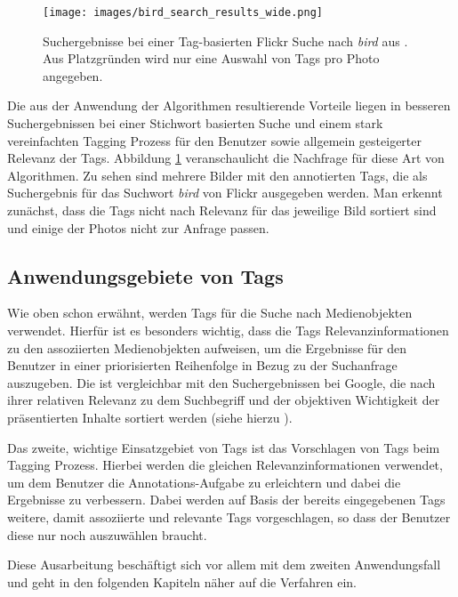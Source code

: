 \begin{figure}[htbp]
  \centering
    \texttt{[image: images/bird\_search\_results\_wide.png]}
  \caption{Suchergebnisse bei einer Tag-basierten Flickr Suche nach \emph{bird} aus \cite{ranking}. Aus Platzgründen wird nur eine Auswahl von Tags pro Photo angegeben.}
  \label{fig:images_bird_search_results}
\end{figure}

Die aus der Anwendung der Algorithmen resultierende Vorteile liegen in besseren Suchergebnissen bei einer Stichwort basierten Suche und einem stark vereinfachten Tagging Prozess für den Benutzer sowie allgemein gesteigerter Relevanz der Tags. Abbildung \ref{fig:images_bird_search_results} veranschaulicht die Nachfrage für diese Art von Algorithmen. Zu sehen sind mehrere Bilder mit den annotierten Tags, die als Suchergebnis für das Suchwort \emph{bird} von Flickr ausgegeben werden. Man erkennt zunächst, dass die Tags nicht nach Relevanz für das jeweilige Bild sortiert sind und einige der Photos nicht zur Anfrage passen.



\subsection{Anwendungsgebiete von Tags} %
\label{sub:anwendungsgebiete}

Wie oben schon erwähnt, werden Tags für die Suche nach Medienobjekten verwendet. Hierfür ist es besonders wichtig, dass die Tags Relevanzinformationen zu den assoziierten Medienobjekten aufweisen, um die Ergebnisse für den Benutzer in einer priorisierten Reihenfolge in Bezug zu der Suchanfrage auszugeben. Die ist vergleichbar mit den Suchergebnissen bei Google, die nach ihrer relativen Relevanz zu dem Suchbegriff und der objektiven Wichtigkeit der präsentierten Inhalte sortiert werden (siehe hierzu \cite{googlePageRank}).

Das zweite, wichtige Einsatzgebiet von Tags ist das Vorschlagen von Tags beim Tagging Prozess. Hierbei werden die gleichen Relevanzinformationen verwendet, um dem Benutzer die Annotations-Aufgabe zu erleichtern und dabei die Ergebnisse zu verbessern. Dabei werden auf Basis der bereits eingegebenen Tags weitere, damit assoziierte und relevante Tags vorgeschlagen, so dass der Benutzer diese nur noch auszuwählen braucht.

Diese Ausarbeitung beschäftigt sich vor allem mit dem zweiten Anwendungsfall und geht in den folgenden Kapiteln näher auf die Verfahren ein.




% 
